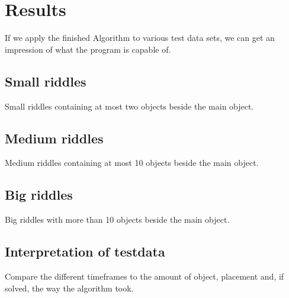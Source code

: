 \chapter{Results}
If we apply the finished Algorithm to various test data sets, we can get an impression of what the program is capable of.
\section{Small riddles}
Small riddles containing at most two objects beside the main object.
\section{Medium riddles}
Medium riddles containing at most 10 objects beside the main object. %
\section{Big riddles}
Big riddles with more than 10 objects beside the main object.
\section{Interpretation of testdata}
Compare the different timeframes to the amount of object, placement and, if solved, the way the algorithm took.